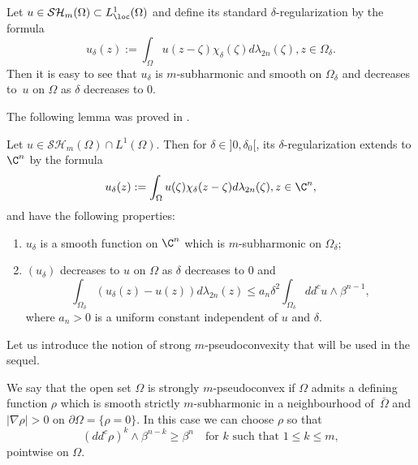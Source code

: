 Let $u \in \mathcal{SH}_m (\Omega) \subset L^1_{\loc} (\Omega)$ and define its standard $\delta$-regularization by the formula%
\begin{equation} \label{eq:reg}
{ u}_{\delta} (z):= \int_{\Omega} u (z - \zeta) \chi_{\delta} (\zeta) d \lambda_{2n} (\zeta), z \in \Omega_{\delta}.
\end{equation}
Then it is easy to see that $ {u}_{\delta}$ is $m$-subharmonic and smooth on $\Omega_{\delta}$ and decreases to~$u$ on $\Omega$ as $\delta $ decreases to $0$.

The following lemma was proved in \cite{GKZ08}.

\begin{lemma} \label{lem:Poisson-Jensen}
Let $u \in \mathcal{SH}_m (\Omega) \cap L^{1} (\Omega)$. Then for $\delta\in{}]0,\delta_0[$, its $\delta$-regularization extends to $\C^n$ by the formula
\begin{equation} \label{eq:regularization}
{ u}_{\delta} (z):= \int_{\Omega} u (\zeta) \chi_{\delta} (z - \zeta) d \lambda_{2n} (\zeta), z \in \C^n,
\end{equation}
and have the following properties:
\begin{enumerate}
\item
$ { u}_{\delta}$ is a smooth function on $\C^n$ which is $m$-subharmonic on $\Omega_\delta$;

\item
$({u}_\delta)$ decreases to $u$ on $\Omega$ as $\delta $ decreases to $0$ and
\[
\int_{\Omega_\delta} ( { u}_{\delta} (z) - u(z)) d\lambda_{2 n}(z) \leq a_n \delta^2 \int_{\Omega_\delta} dd^c u \wedge \beta^{n - 1},
\]
where $a_n > 0$ is a uniform constant independent of $u$ and $\delta$.
\end{enumerate}
\end{lemma}

Let us introduce the notion of strong $m$-pseudoconvexity that will be used in the sequel.

\begin{definition} We say that the open set $\Omega$ is strongly $m$-pseudoconvex if $\Omega$ admits a defining function $\rho$ which is smooth strictly $m$-subharmonic in a neighbourhood of~$\bar \Omega$ and $\vert \nabla \rho\vert > 0$ on $\partial \Omega = \{\rho = 0\}$. In this case we can choose $\rho $ so that
\begin{equation} \label{eq:stronpconvexity}
(dd^c \rho)^k \wedge \beta^{n - k} \geq \beta^n \quad \text{for $k$ such that }1 \leq k \leq m,
\end{equation}
pointwise on $\Omega$.
\end{definition}


